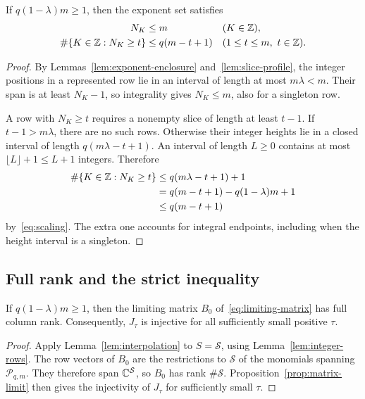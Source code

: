 \begin{lemma}\label{lem:integer-rows}
If $q(1-\lambda)m\ge1$, then the exponent set satisfies
\begin{equation}\label{eq:row-count}
 \begin{aligned}
 N_K&\le m &&(K\in\mathbb Z),\\
 \#\{K\in\mathbb Z:N_K\ge t\}
 &\le q(m-t+1) &&(1\le t\le m,\ t\in\mathbb Z).
 \end{aligned}
\end{equation}
\end{lemma}

\begin{proof}
By Lemmas~\ref{lem:exponent-enclosure} and~\ref{lem:slice-profile},
the integer positions in a represented row lie in an interval of
length at most $m\lambda<m$. Their span is at least $N_K-1$, so
integrality gives $N_K\le m$, also for a singleton row.

A row with $N_K\ge t$ requires a nonempty slice of length at least
$t-1$. If $t-1>m\lambda$, there are no such rows. Otherwise their
integer heights lie in a closed interval of length
$q(m\lambda-t+1)$. An interval of length $L\ge0$ contains at most
$\lfloor L\rfloor+1\le L+1$ integers. Therefore
\[
 \begin{aligned}
 \#\{K\in\mathbb Z:N_K\ge t\}
 &\le q(m\lambda-t+1)+1\\
 &=q(m-t+1)-q(1-\lambda)m+1\\
 &\le q(m-t+1)
 \end{aligned}
\]
by~\eqref{eq:scaling}. The extra one accounts for integral endpoints,
including when the height interval is a singleton.
\end{proof}

\subsection{Full rank and the strict inequality}

\begin{proposition}\label{prop:full-rank}
If $q(1-\lambda)m\ge1$, then the limiting matrix $B_0$
of~\eqref{eq:limiting-matrix} has full column rank. Consequently,
$J_\tau$ is injective for all sufficiently small positive $\tau$.
\end{proposition}

\begin{proof}
Apply Lemma~\ref{lem:interpolation} to $S=\mathcal S$, using
Lemma~\ref{lem:integer-rows}. The row vectors of $B_0$ are the
restrictions to $\mathcal S$ of the monomials spanning
$\mathcal P_{q,m}$. They therefore span $\mathbb C^{\mathcal S}$, so
$B_0$ has rank $\#\mathcal S$. Proposition~\ref{prop:matrix-limit}
then gives the injectivity of $J_\tau$ for sufficiently small $\tau$.
\end{proof}

